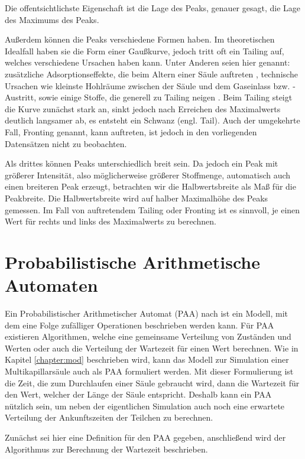 Die offentsichtlichste Eigenschaft ist die Lage des Peaks, genauer gesagt, die Lage des Maximums des Peaks.

Außerdem können die Peaks verschiedene Formen haben. Im theoretischen Idealfall haben sie die Form einer Gaußkurve, jedoch tritt oft ein Tailing auf, welches verschiedene Ursachen haben kann. Unter Anderen seien hier genannt: zusätzliche Adsorptionseffekte, die beim Altern einer Säule auftreten \cite{kolb2003}, technische Ursachen wie kleinste Hohlräume zwischen der Säule und dem Gaseinlass bzw. -Austritt, sowie einige Stoffe, die generell zu Tailing neigen . 
Beim Tailing steigt die Kurve zunächst stark an, sinkt jedoch nach Erreichen des Maximalwerts deutlich langsamer ab, es entsteht ein Schwanz (engl. Tail). Auch der umgekehrte Fall, Fronting genannt, kann auftreten, ist jedoch in den vorliegenden Datensätzen nicht zu beobachten.

Als drittes können Peaks unterschiedlich breit sein. Da jedoch ein Peak mit größerer Intensität, also möglicherweise größerer Stoffmenge, automatisch auch einen breiteren Peak erzeugt, betrachten wir die Halbwertsbreite als Maß für die Peakbreite. Die Halbwertsbreite wird auf halber Maximalhöhe des Peaks gemessen. Im Fall von auftretendem Tailing oder Fronting ist es sinnvoll, je einen Wert für rechts und links des Maximalwerts zu berechnen.


\section{Probabilistische Arithmetische Automaten}
Ein Probabilistischer Arithmetischer Automat (PAA) nach \cite{MHKR} ist ein Modell, mit dem eine Folge zufälliger Operationen beschrieben werden kann. 
Für PAA existieren Algorithmen, welche eine gemeinsame Verteilung von Zuständen und Werten oder auch die Verteilung der Wartezeit für einen Wert berechnen. Wie in Kapitel \ref{chapter:mod} beschrieben wird, kann das Modell zur Simulation einer Multikapillarsäule auch als PAA formuliert werden. Mit dieser Formulierung ist die Zeit, die zum Durchlaufen einer Säule gebraucht wird, dann die Wartezeit für den Wert, welcher der Länge der Säule entspricht. Deshalb kann ein PAA nützlich sein, um neben der eigentlichen Simulation auch noch eine erwartete Verteilung der Ankunftszeiten der Teilchen zu berechnen. 

Zunächst sei hier eine Definition für den PAA gegeben, anschließend wird der Algorithmus zur Berechnung der Wartezeit beschrieben.

